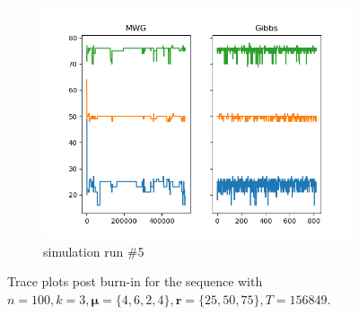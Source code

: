 \begin{figure}[H]
\begin{subfigure}{.3\textwidth}
    	\includegraphics[width=\linewidth]{../../plots/Trace_post_burnin_M4_N100_NMCMC3_seed4_diffind2.png}
    	\caption{simulation run \#5}
	\end{subfigure}
	\caption{Trace plots post burn-in for the sequence with $n=100, k=3, \bm{\mu} = \{4,6,2,4\}, \bm{r} = \{25,50,75\}, T=156849$.}
\end{figure}

